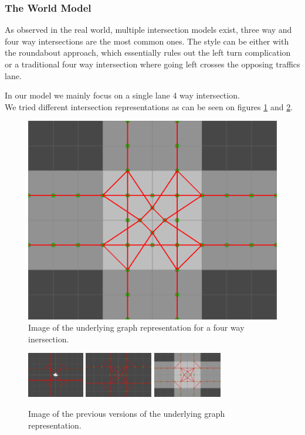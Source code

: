 \subsubsection{The World Model}
As observed in the real world, multiple intersection models exist, three way and four way intersections are the most common ones.
The style can be either with the roundabout approach, which essentially rules out the left turn complication or a traditional four way intersection where going left crosses the opposing traffics lane.

In our model we mainly focus on a single lane 4 way intersection.\\ We tried different intersection representations as can be seen on figures \ref{figure:graph} and \ref{figure:graphs}.

\begin{figure}
\centering
\includegraphics[scale=.4]{img/graph.png}
\caption{Image of the underlying graph representation for a four way inersection.}
\label{figure:graph}
\end{figure}

\begin{figure}
\centering
\includegraphics[height=75px]{img/graph-old1.png}
\includegraphics[height=75px]{img/graph-old2.png}
\includegraphics[height=75px]{img/graph-old3.png}
\caption{Image of the previous versions of the underlying graph representation.}
\label{figure:graphs}
\end{figure}

